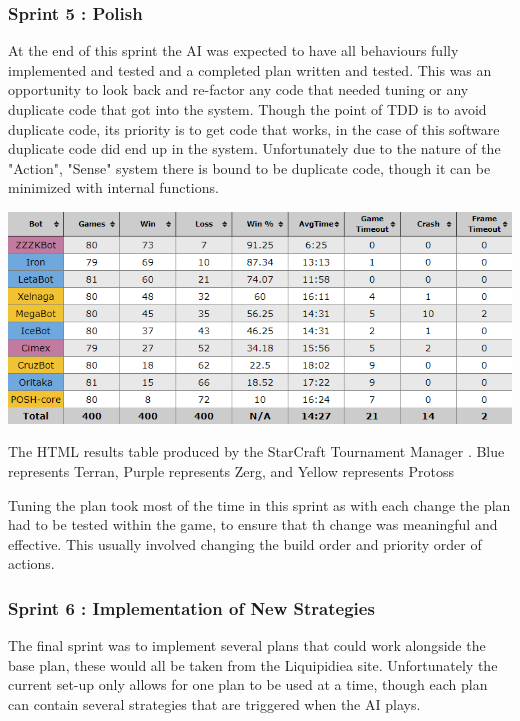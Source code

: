 \documentclass[journal]{IEEEtran}
\begin{document}
\subsubsection{Sprint 5 : Polish}
At the end of this sprint the AI was expected to have all behaviours fully implemented and tested and a completed plan written and tested. This was an opportunity to look back and re-factor any code that needed tuning or any duplicate code that got into the system. Though the point of TDD is to avoid duplicate code, its priority is to get code that works, in the case of this software duplicate code did end up in the system. Unfortunately due to the nature of the "Action", "Sense" system there is bound to be duplicate code, though it can be minimized with internal functions.
\begin{table}[]
	\centering
	\includegraphics[width=\textwidth]{STMResultsWithBot}
	\caption{The HTML results table produced by the StarCraft Tournament Manager \cite{Tournament}. Blue represents Terran, Purple represents Zerg, and Yellow represents Protoss}
	\label{Table1}
\end{table}
Tuning the plan took most of the time in this sprint as with each change the plan had to be tested within the game, to ensure that th change was meaningful and effective. This usually involved changing the build order and priority order of actions.
\newline
{}
\subsubsection{Sprint 6 : Implementation of New Strategies}
The final sprint was to implement several plans that could work alongside the base plan, these would all be taken from the Liquipidiea site. Unfortunately the current set-up only allows for one plan to be used at a time, though each plan can contain several strategies that are triggered when the AI plays.
\newline
\end{document}
